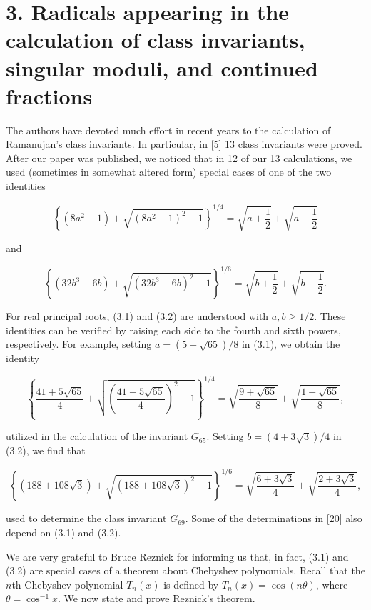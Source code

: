 \documentclass[11pt,letterpaper]{article}
\begin{document}
\section*{3. Radicals appearing in the calculation of class invariants, singular moduli, and continued fractions}
The authors have devoted much effort in recent years to the calculation of Ramanujan's class invariants. In particular, in [5] 13 class invariants were proved. After our paper was published, we noticed that in 12 of our 13 calculations, we used (sometimes in somewhat altered form) special cases of one of the two identities


\begin{equation*}
\left\{\left(8 a^{2}-1\right)+\sqrt{\left(8 a^{2}-1\right)^{2}-1}\right\}^{1 / 4}=\sqrt{a+\frac{1}{2}}+\sqrt{a-\frac{1}{2}} \tag{3.1}\label{eq:3.1}
\end{equation*}


and


\begin{equation*}
\left\{\left(32 b^{3}-6 b\right)+\sqrt{\left(32 b^{3}-6 b\right)^{2}-1}\right\}^{1 / 6}=\sqrt{b+\frac{1}{2}}+\sqrt{b-\frac{1}{2}} . \tag{3.2}\label{eq:3.2}
\end{equation*}


For real principal roots, (3.1) and (3.2) are understood with $a,b\geq 1/2$. These identities can be verified by raising each side to the fourth and sixth powers, respectively. For example, setting $a=(5+\sqrt{65}) / 8$ in (3.1), we obtain the identity

\[
\left\{\frac{41+5 \sqrt{65}}{4}+\sqrt{\left(\frac{41+5 \sqrt{65}}{4}\right)^{2}-1}\right\}^{1 / 4}=\sqrt{\frac{9+\sqrt{65}}{8}}+\sqrt{\frac{1+\sqrt{65}}{8}},
\]

utilized in the calculation of the invariant $G_{65}$. Setting $b=(4+3 \sqrt{3}) / 4$ in (3.2), we find that

\[
\left\{(188+108 \sqrt{3})+\sqrt{(188+108 \sqrt{3})^{2}-1}\right\}^{1 / 6}=\sqrt{\frac{6+3 \sqrt{3}}{4}}+\sqrt{\frac{2+3 \sqrt{3}}{4}},
\]

used to determine the class invariant $G_{69}$. Some of the determinations in [20] also depend on (3.1) and (3.2).

We are very grateful to Bruce Reznick for informing us that, in fact, (3.1) and (3.2) are special cases of a theorem about Chebyshev polynomials. Recall that the $n$th Chebyshev polynomial $T_{n}(x)$ is defined by $T_{n}(x)=\cos (n \theta)$, where $\theta=\cos ^{-1} x$. We now state and prove Reznick's theorem.
\end{document}
